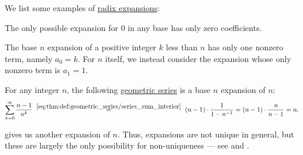 \begin{example}\label{ex:def:real_number_radix_expansion}
  We list some examples of \hyperref[def:real_number_radix_expansion]{radix expansions}:
  \begin{thmenum}
     The only possible expansion for \( 0 \) in any base has only zero coefficients.

     The base \( n \) expansion of a positive integer \( k \) less than \( n \) has only one nonzero term, namely \( a_0 = k \). For \( n \) itself, we instead consider the expansion whose only nonzero term is \( a_1 = 1 \).

     For any integer \( n \), the following \hyperref[eq:def:geometric_progression/recursive]{geometric series} is a base \( n \) expansion of \( n \):
    \begin{equation}\label{eq:ex:def:real_number_radix_expansion/geometric}
      \sum_{k=0}^\infty \frac {n - 1} {n^k}
      \reloset{\eqref{eq:thm:def:geometric_series/series_sum_interior}} =
      (n - 1) \cdot \frac 1 {1 - n^{-1}}
      =
      (n - 1) \cdot \frac n {n - 1}
      =
      n.
    \end{equation}

     gives us another expansion of \( n \). Thus, expansions are not unique in general, but these are largely the only possibility for non-uniqueness --- see  and .
  \end{thmenum}
\end{example}

